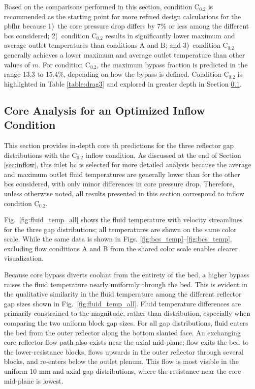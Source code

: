 Based on the comparisons performed in this section, condition C$_{0.2}$ is recommended as the starting point for more refined design calculations for the \gls{pbfhr} because 1)~the core pressure drop differs by 7\% or less among the different \glspl{bc} considered; 2)~condition C$_\text{0.2}$ results in significantly lower maximum and average outlet temperatures than conditions A and B; and 3)~condition C$_\text{0.2}$ generally achieves a lower maximum and average outlet temperature than other values of \(m\). For condition C$_{0.2}$, the maximum bypass fraction is predicted in the range 13.3 to 15.4\%, depending on how the bypass is defined. Condition C$_{0.2}$ is highlighted in Table \ref{table:drag3} and explored in greater depth in Section \ref{sec:depth}.

\subsection{Core Analysis for an Optimized Inflow Condition}
\label{sec:depth}

This section provides in-depth core \gls{th} predictions for the three reflector gap distributions with the C$_\text{0.2}$ inflow condition. As discussed at the end of Section \ref{sec:inflow}, this inlet \gls{bc} is selected for more detailed analysis because the average and maximum outlet fluid temperatures are generally lower than for the other \glspl{bc} considered, with only minor differences in core pressure drop. Therefore, unless otherwise noted, all results presented in this section correspond to inflow condition C$_\text{0.2}$.

Fig.\ \ref{fig:fluid_temp_all} shows the fluid temperature with velocity streamlines for the three gap distributions; all temperatures are shown on the same color scale. While the same data is shown in Figs. \ref{fig:bcs_temp}--\ref{fig:bcs_temp}, excluding flow conditions A and B from the shared color scale enables clearer visualization. 

Because core bypass diverts coolant from the entirety of the bed, a higher bypass raises the fluid temperature nearly uniformly through the bed. This is evident in the qualitative similarity in the fluid temperature among the different reflector gap sizes shown in Fig.\ \ref{fig:fluid_temp_all}. Fluid temperature differences are primarily constrained to the magnitude, rather than distribution, especially when comparing the two uniform block gap sizes. For all gap distributions, fluid enters the bed from the outer reflector along the bottom slanted face. An exchanging core-reflector flow path also exists near the axial mid-plane; flow exits the bed to the lower-resistance blocks, flows upwards in the outer reflector through several blocks, and re-enters below the outlet plenum. This flow is most visible in the uniform 10 \si{\milli\meter} and axial gap distributions, where the resistance near the core mid-plane is lowest.

